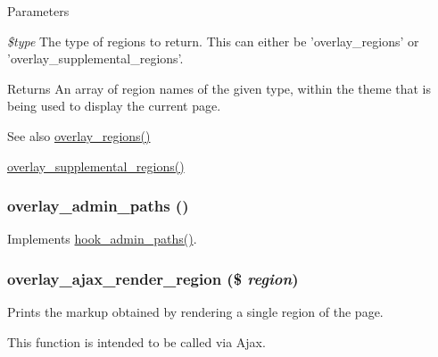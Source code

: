 \begin{DoxyParams}{Parameters}
\item[{\em \$type}]The type of regions to return. This can either be 'overlay\_\-regions' or 'overlay\_\-supplemental\_\-regions'.\end{DoxyParams}
\begin{DoxyReturn}{Returns}
An array of region names of the given type, within the theme that is being used to display the current page.
\end{DoxyReturn}
\begin{DoxySeeAlso}{See also}
\hyperlink{overlay_8module_abc2ab232b7d87656670589aacbf8f97c}{overlay\_\-regions()} 

\hyperlink{overlay_8module_a450e5cee4c93de608b64aa7b3fc8cfe4}{overlay\_\-supplemental\_\-regions()} 
\end{DoxySeeAlso}
\hypertarget{overlay_8module_a1ccea18af9d51ab0f5549bbb95f3976c}{
\subsubsection[{overlay\_\-admin\_\-paths}]{\setlength{\rightskip}{0pt plus 5cm}overlay\_\-admin\_\-paths ()}}
\label{overlay_8module_a1ccea18af9d51ab0f5549bbb95f3976c}
Implements \hyperlink{group__hooks_ga3fe6d93afc8bb04afbd9e3c326d1bdc1}{hook\_\-admin\_\-paths()}. \hypertarget{overlay_8module_a31a27bee3e7a1abbf1de30520ac521ec}{
\subsubsection[{overlay\_\-ajax\_\-render\_\-region}]{\setlength{\rightskip}{0pt plus 5cm}overlay\_\-ajax\_\-render\_\-region (\$ {\em region})}}
\label{overlay_8module_a31a27bee3e7a1abbf1de30520ac521ec}
Prints the markup obtained by rendering a single region of the page.

This function is intended to be called via Ajax.


